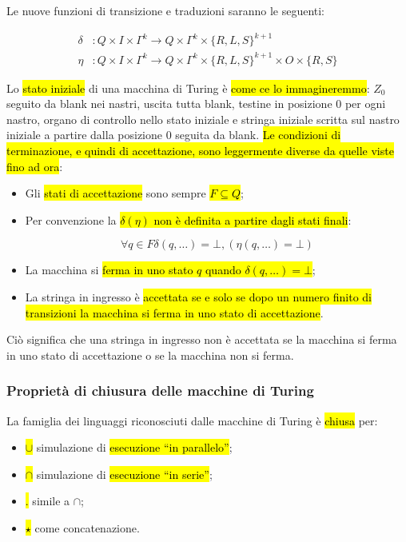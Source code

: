 \documentclass[a4paper,11pt,oneside]{article}
\theoremstyle{plain}
\theoremstyle{definition}
\theoremstyle{remark}
\begin{document}
Le nuove funzioni di transizione e traduzioni saranno le seguenti:

\begin{align}
  \delta&: Q \times I \times \Gamma^k \to
    Q \times \Gamma^k \times {\{R,L,S\}}^{k+1} \\
  \eta&: Q \times I \times \Gamma^k \to
    Q \times \Gamma^k \times {\{R,L,S\}}^{k+1} \times O \times \{R,S\}
\end{align}

Lo \hl{stato iniziale} di una macchina di Turing è \hl{come ce lo
immagineremmo}: $Z_0$ seguito da blank nei nastri, uscita tutta blank, testine
in posizione 0 per ogni nastro, organo di controllo nello stato iniziale e
stringa iniziale scritta sul nastro iniziale a partire dalla posizione 0 seguita
da blank. \hl{Le condizioni di terminazione, e quindi di accettazione, sono
leggermente diverse da quelle viste fino ad ora}:

\begin{itemize}
  \item Gli \hl{stati di accettazione} sono sempre \hl{$F \subseteq Q$};
  \item Per convenzione la \hl{$\delta (\eta)$ non è definita a partire dagli
    stati finali}:

    \begin{equation}
      \forall q \in F \delta(q, \ldots) = \bot, (\eta (q, \ldots) = \bot)
    \end{equation}

  \item La macchina si \hl{ferma in uno stato $q$ quando
    $\delta(q, \ldots) = \bot$};
  \item La stringa in ingresso è \hl{accettata se e solo se dopo un numero
    finito di transizioni la macchina si ferma in uno stato di accettazione}.
\end{itemize}

Ciò significa che una stringa in ingresso non è accettata se la macchina si
ferma in uno stato di accettazione o se la macchina non si ferma.

\subsubsection{Proprietà di chiusura delle macchine di Turing}\label{sec:analisi-mt}

La famiglia dei linguaggi riconosciuti dalle macchine di Turing è \hl{chiusa}
per:

\begin{itemize}
  \item \hl{$\cup$} simulazione di \hl{esecuzione ``in parallelo''};
  \item \hl{$\cap$} simulazione di \hl{esecuzione ``in serie''};
  \item \hl{$ . $} simile a $\cap$;
  \item \hl{$\star$} come concatenazione.
\end{itemize}
\end{document}
